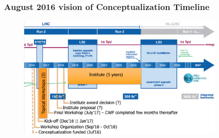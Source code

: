 \begin{frame}
\frametitle{August 2016 vision of Conceptualization Timeline}

\begin{figure}[htbp]
\begin{center}
\includegraphics[width=0.9\textwidth]{images/S2I2_timeline.png}
\end{center}
\end{figure}


\end{frame}


